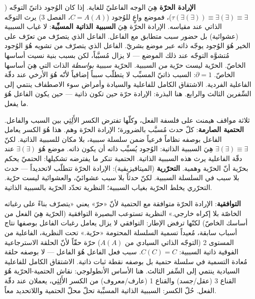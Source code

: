 \documentclass[10pt, openany, oneside]{book}
\begin{document}
\textbf{الإرادة الحرّة} هِيَ الوجه الفاعليّ للغاية. إذا كان الوُجود ذاتيّ التوجّه ($\tau(\exists(\exists)) \equiv \exists(\exists) \equiv \exists$)، فموضع واعٍ للوُجود ($C = A(A)$، الفصل 3) يرث التوجّه الذاتي عند مقياسه. الإرادة الحرّة هِيَ \textbf{السببية الذاتية المسبِّبة}: لا غياب السببية (عشوائية) بل حضور سبب متطابق مع الفاعل. الفاعل الذي يتصرّف من تعرّف على الخير هُوَ الوُجود يوجّه ذاته عبر موضع بشريّ. الفاعل الذي يتصرّف من تشويه هُوَ الوُجود مُتشوَّه التوجّه عند ذلك الموضع --- لا يزال مُسبَّباً، لكن بسبب بنية نسيت أساسها الخاصّ. الحرّية ليست حرّية \textit{من} السببية. الحرّية سببية \textit{بواسطة} الذات التي هِيَ أساسها الخاصّ. $\partial = 1$: السبب ذاتيّ المسبِّب لا يتطلّب سبباً إضافياً لأنّه هُوَ الأرخي عند دقّة الفاعلية الفردية. الاشتقاق الكامل للفاعلية والسيادة وأمراض سوء الاصطفاف ينتمي إلى السِّفرين الثالث والرابع. هنا البذرة: الإرادة حرّة حين تكون ذاتية --- حين يكون الفاعل هُوَ ما يفعل.

ثلاثة مواقف هيمنت على فلسفة الفعل، وكلّها تفترض الكسر الأَلِثِي بين السبب والفاعل. \textbf{الحتمية الصارمة}: كلّ حدث مُسبَّب بالضرورة؛ الإرادة الحرّة وهم. هذا هُوَ الكسر يعامل الفاعل بوصفه نظاماً فرعياً ضمن سلسلة سببية، بلا مكان للسببية الذاتية. لكنّ $\exists(\exists) \equiv \exists$ هِيَ السببية الذاتية: الوُجود يُسبِّب ذاته أن يكون ذاته. موضع هُوَ $\exists(\exists)$ عند دقّة الفاعلية يرث هذه السببية الذاتية. الحتمية تنكر ما يفترضه تشكيلها: الحتميّ يحكم بحرّية أنّ الحرّية وهمية. \textbf{التحرّرية} (الميتافيزيقية): الإرادة الحرّة تتطلّب لاتحديداً --- حدث بلا سبب في السلسلة السببية. لكنّ حدثاً بلا سبب عشوائيّ، والعشوائية ليست حرّية. التحرّري يخلط الحرّية بغياب السببية؛ النظرية تحدّد الحرّية بالسببية الذاتية.

\textbf{التوافقية}: الإرادة الحرّة متوافقة مع الحتمية لأنّ «حرّ» يعني «يتصرّف بناءً على رغباته الخاصّة بلا إكراه خارجي.» النظرية تستوعب البصيرة التوافقية (الحرّية هِيَ الفعل من أساسك الخاصّ) لكنّها ترفض الإطار: التوافقي لا يزال يعامل رغبات الفاعل بوصفها نتاج أسباب سابقة، مُعيداً تسمية السلسلة المحتومة «حرّية.» تحت النظرية، الفاعلية من المستوى 2 (التوجّه الذاتي السيادي من $A(A)$) حرّة حقّاً لأنّ الحلقة الاسترجاعية الفوقية ذاتية السببية: $C(C) = C$. سبب فعل الفاعل هُوَ الفاعل --- لا بوصفه حلقة مُعادة التسمية في سلسلة حتمية بل بوصفه نقطة ثبات ذاتية. الاشتقاق الكامل للفاعلية السيادية ينتمي إلى السِّفر الثالث. هنا الأساس الأنطولوجي: نقاش الحتمية-الحرّية هُوَ القناع 3 (عقل/جسد) والقناع 1 (عارف/معروف) من الكسر الأَلِثِي، يعملان عند دقّة الفعل. حُلّ الكسر: السببية الذاتية المسبِّبة تحلّ محلّ الحتمية واللاتحديد معاً.

\vspace{0.5em}
\end{document}
